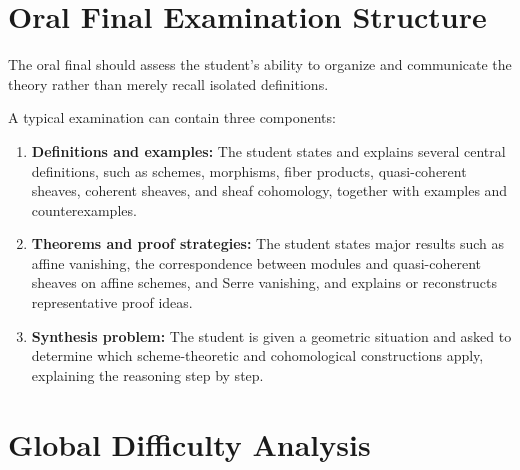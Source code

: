 \documentclass[11pt]{article}
\begin{document}
\section{Oral Final Examination Structure}

The oral final should assess the student's ability to organize and communicate the theory rather than merely recall isolated definitions.

A typical examination can contain three components:

\begin{enumerate}
    \item \textbf{Definitions and examples:} The student states and explains several central definitions, such as schemes, morphisms, fiber products, quasi-coherent sheaves, coherent sheaves, and sheaf cohomology, together with examples and counterexamples.
    \item \textbf{Theorems and proof strategies:} The student states major results such as affine vanishing, the correspondence between modules and quasi-coherent sheaves on affine schemes, and Serre vanishing, and explains or reconstructs representative proof ideas.
    \item \textbf{Synthesis problem:} The student is given a geometric situation and asked to determine which scheme-theoretic and cohomological constructions apply, explaining the reasoning step by step.
\end{enumerate}

\section{Global Difficulty Analysis}
\end{document}
